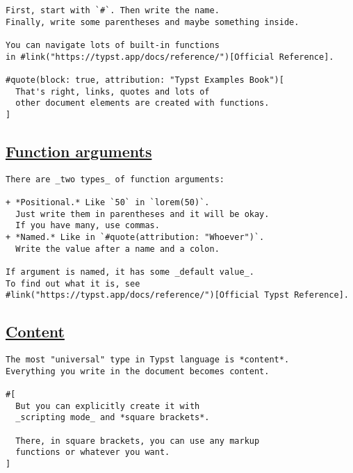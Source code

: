 \begin{verbatim}
First, start with `#`. Then write the name.
Finally, write some parentheses and maybe something inside.

You can navigate lots of built-in functions
in #link("https://typst.app/docs/reference/")[Official Reference].

#quote(block: true, attribution: "Typst Examples Book")[
  That's right, links, quotes and lots of
  other document elements are created with functions.
]
\end{verbatim}

\pandocbounded{}

\subsection{\texorpdfstring{\hyperref[function-arguments]{Function
arguments}}{Function arguments}}\label{function-arguments}

\begin{verbatim}
There are _two types_ of function arguments:

+ *Positional.* Like `50` in `lorem(50)`.
  Just write them in parentheses and it will be okay.
  If you have many, use commas.
+ *Named.* Like in `#quote(attribution: "Whoever")`.
  Write the value after a name and a colon.

If argument is named, it has some _default value_.
To find out what it is, see
#link("https://typst.app/docs/reference/")[Official Typst Reference].
\end{verbatim}

\pandocbounded{}

\subsection{\texorpdfstring{\hyperref[content]{Content}}{Content}}\label{content}

\begin{verbatim}
The most "universal" type in Typst language is *content*.
Everything you write in the document becomes content.

#[
  But you can explicitly create it with
  _scripting mode_ and *square brackets*.

  There, in square brackets, you can use any markup
  functions or whatever you want.
]
\end{verbatim}

